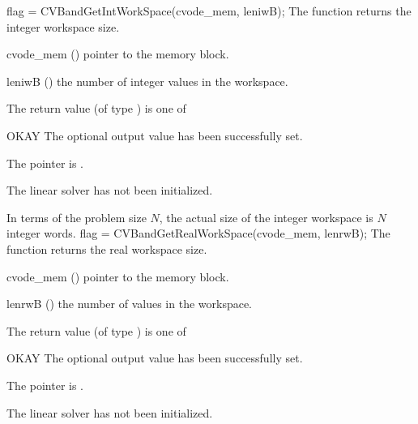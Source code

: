 %
%
{
  flag = CVBandGetIntWorkSpace(cvode\_mem, leniwB);
}
{
  The function  returns the
  {\cvband} integer workspace size.
}
{
  \begin{args}
  \item[cvode\_mem] ()
    pointer to the {\cvode} memory block.
  \item[leniwB] ()
    the number of integer values in the {\cvband} workspace.
  \end{args}
}
{
  The return value  (of type ) is one of
  \begin{args}
  \item[OKAY] 
    The optional output value has been successfully set.
  \item[\Id{LIN\_NO\_MEM}]
    The  pointer is .
  \item[\Id{LIN\_NO\_LMEM}]
    The {\cvband} linear solver has not been initialized.
  \end{args}
}
{
  In terms of the problem size $N$, the actual size of the integer workspace
  is $N$ integer words.
}
{
  flag = CVBandGetRealWorkSpace(cvode\_mem, lenrwB);
}
{
  The function  returns the
  {\cvband} real workspace size.
}
{
  \begin{args}
  \item[cvode\_mem] ()
    pointer to the {\cvode} memory block.
  \item[lenrwB] ()
    the number of  values in the {\cvband} workspace.
  \end{args}
}
{
  The return value  (of type ) is one of
  \begin{args}
  \item[OKAY] 
    The optional output value has been successfully set.
  \item[\Id{LIN\_NO\_MEM}]
    The  pointer is .
  \item[\Id{LIN\_NO\_LMEM}]
    The {\cvband} linear solver has not been initialized.
  \end{args}
}
